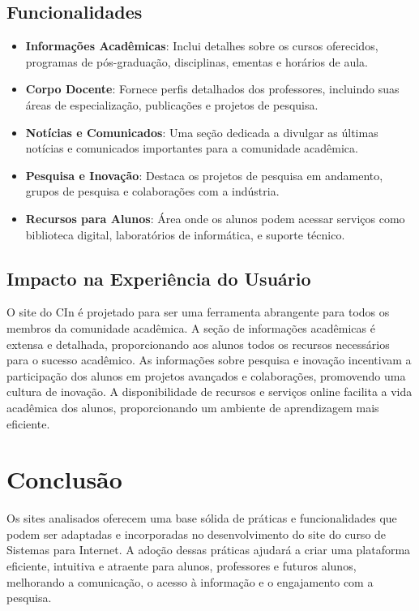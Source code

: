 \documentclass[a4paper,12pt]{report}
\begin{document}
\subsection{Funcionalidades} 
\begin{itemize} 

    \item \textbf{Informações Acadêmicas}: Inclui detalhes sobre os cursos oferecidos, programas de pós-graduação, disciplinas, ementas e horários de aula. 

    \item \textbf{Corpo Docente}: Fornece perfis detalhados dos professores, incluindo suas áreas de especialização, publicações e projetos de pesquisa. 

    \item \textbf{Notícias e Comunicados}: Uma seção dedicada a divulgar as últimas notícias e comunicados importantes para a comunidade acadêmica. 

    \item \textbf{Pesquisa e Inovação}: Destaca os projetos de pesquisa em andamento, grupos de pesquisa e colaborações com a indústria. 

    \item \textbf{Recursos para Alunos}: Área onde os alunos podem acessar serviços como biblioteca digital, laboratórios de informática, e suporte técnico. 

\end{itemize} 

\subsection{Impacto na Experiência do Usuário} 
O site do CIn é projetado para ser uma ferramenta abrangente para todos os membros da comunidade acadêmica. A seção de informações acadêmicas é extensa e detalhada, proporcionando aos alunos todos os recursos necessários para o sucesso acadêmico. As informações sobre pesquisa e inovação incentivam a participação dos alunos em projetos avançados e colaborações, promovendo uma cultura de inovação. A disponibilidade de recursos e serviços online facilita a vida acadêmica dos alunos, proporcionando um ambiente de aprendizagem mais eficiente.  

\section{Conclusão} 

Os sites analisados oferecem uma base sólida de práticas e funcionalidades que podem ser adaptadas e incorporadas no desenvolvimento do site do curso de Sistemas para Internet. A adoção dessas práticas ajudará a criar uma plataforma eficiente, intuitiva e atraente para alunos, professores e futuros alunos, melhorando a comunicação, o acesso à informação e o engajamento com a pesquisa.
\end{document}
